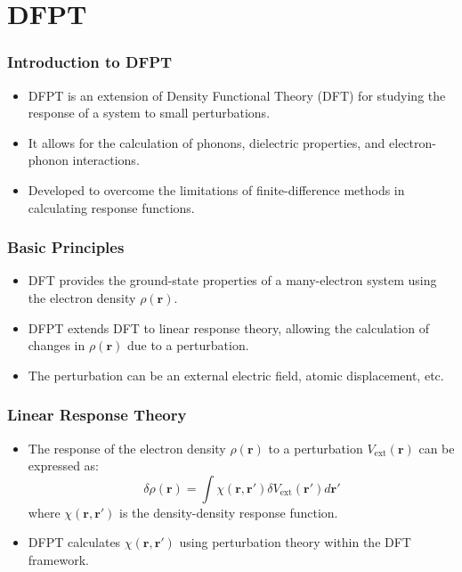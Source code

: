 \documentclass{CustomBeamer}
\begin{document}
    


\section{DFPT}
\begin{frame}
    \frametitle{Introduction to DFPT}
    \begin{itemize}
        \item DFPT is an extension of Density Functional Theory (DFT) for studying the response of a system to small perturbations.
        \item It allows for the calculation of phonons, dielectric properties, and electron-phonon interactions.
        \item Developed to overcome the limitations of finite-difference methods in calculating response functions.
    \end{itemize}
    \end{frame}
    
    \begin{frame}
    \frametitle{Basic Principles}
    \begin{itemize}
        \item DFT provides the ground-state properties of a many-electron system using the electron density $\rho(\mathbf{r})$.
        \item DFPT extends DFT to linear response theory, allowing the calculation of changes in $\rho(\mathbf{r})$ due to a perturbation.
        \item The perturbation can be an external electric field, atomic displacement, etc.
    \end{itemize}
    \end{frame}
    
    \begin{frame}
    \frametitle{Linear Response Theory}
    \begin{itemize}
        \item The response of the electron density $\rho(\mathbf{r})$ to a perturbation $V_{\text{ext}}(\mathbf{r})$ can be expressed as:
        \begin{equation}
        \delta \rho(\mathbf{r}) = \int \chi(\mathbf{r}, \mathbf{r}') \delta V_{\text{ext}}(\mathbf{r}') d\mathbf{r}'
        \end{equation}
        where $\chi(\mathbf{r}, \mathbf{r}')$ is the density-density response function.
        \item DFPT calculates $\chi(\mathbf{r}, \mathbf{r}')$ using perturbation theory within the DFT framework.
    \end{itemize}
    \end{frame}
    
\end{document}
